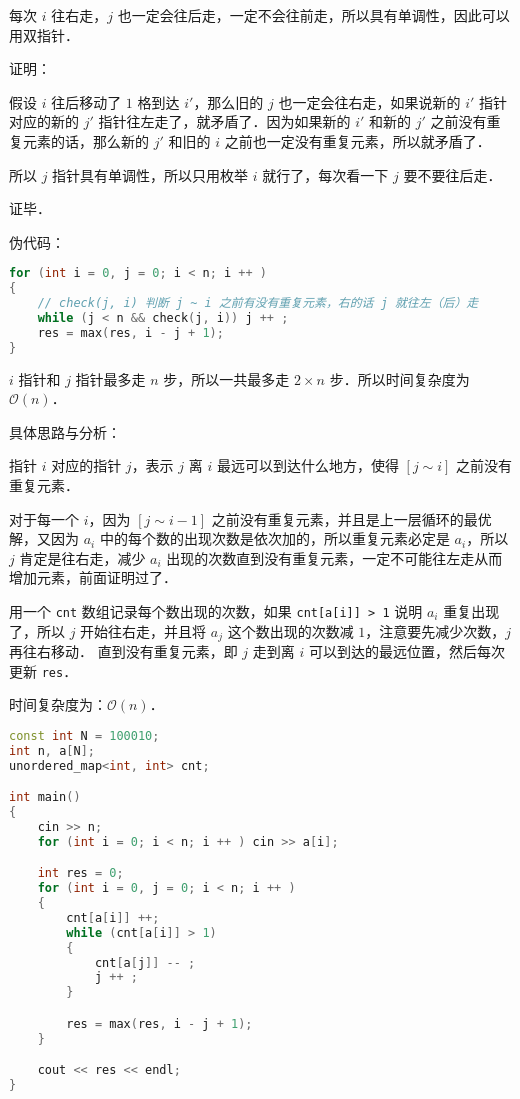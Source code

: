 每次 $i$ 往右走，$j$ 也一定会往后走，一定不会往前走，所以具有单调性，因此可以用双指针．

证明：

假设 $i$ 往后移动了 $1$ 格到达 $i'$，那么旧的 $j$ 也一定会往右走，如果说新的 $i'$ 指针对应的新的 $j'$ 指针往左走了，就矛盾了．因为如果新的 $i'$ 和新的 $j'$ 之前没有重复元素的话，那么新的 $j'$ 和旧的 $i$ 之前也一定没有重复元素，所以就矛盾了．

所以 $j$ 指针具有单调性，所以只用枚举 $i$ 就行了，每次看一下 $j$ 要不要往后走．

证毕．

伪代码：

\begin{lstlisting}[language=cpp]
for (int i = 0, j = 0; i < n; i ++ )
{
    // check(j, i) 判断 j ~ i 之前有没有重复元素，右的话 j 就往左（后）走
    while (j < n && check(j, i)) j ++ ;    
    res = max(res, i - j + 1);
}
\end{lstlisting}

$i$ 指针和 $j$ 指针最多走 $n$ 步，所以一共最多走 $2 \times n$ 步．所以时间复杂度为 $\mathcal{O}(n)$．

具体思路与分析：

指针 $i$ 对应的指针 $j$，表示 $j$ 离 $i$ 最远可以到达什么地方，使得 $[j \sim i]$ 之前没有重复元素．

对于每一个 $i$，因为 $[j \sim i - 1]$ 之前没有重复元素，并且是上一层循环的最优解，又因为 $a_i$ 中的每个数的出现次数是依次加的，所以重复元素必定是 $a_i$，所以 $j$ 肯定是往右走，减少 $a_i$ 出现的次数直到没有重复元素，一定不可能往左走从而增加元素，前面证明过了．

用一个 \verb|cnt| 数组记录每个数出现的次数，如果 \verb|cnt[a[i]] > 1| 说明 $a_i$ 重复出现了，所以 $j$ 开始往右走，并且将 $a_j$ 这个数出现的次数减 $1$，注意要先减少次数，$j$ 再往右移动． 直到没有重复元素，即 $j$ 走到离 $i$ 可以到达的最远位置，然后每次更新 \verb|res|．

时间复杂度为：$\mathcal{O}(n)$．

\begin{lstlisting}[language=cpp]
const int N = 100010;
int n, a[N];
unordered_map<int, int> cnt;

int main() 
{
    cin >> n;
    for (int i = 0; i < n; i ++ ) cin >> a[i];

    int res = 0;
    for (int i = 0, j = 0; i < n; i ++ )
    {
        cnt[a[i]] ++;
        while (cnt[a[i]] > 1)
        {
            cnt[a[j]] -- ;
            j ++ ;
        }

        res = max(res, i - j + 1);
    }

    cout << res << endl;
}
\end{lstlisting}

